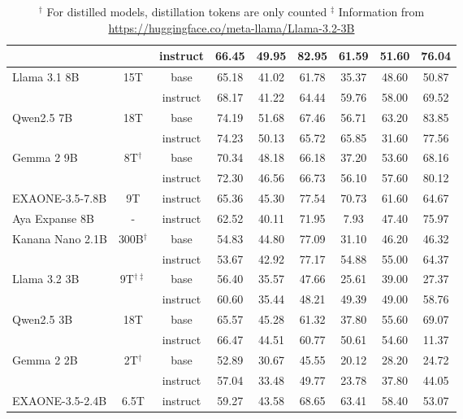 \begin{table}[h]
{\begin{tabular}{lcc|cccccc}
                                     & & instruct & 66.45 & 49.95 & 82.95 & 61.59 & 51.60 & 76.04 \\
\midrule
\multirow{2}{*}{Llama 3.1 8B}        & \multirow{2}{*}{15T} & base     & 65.18 & 41.02 & 61.78 & 35.37 & 48.60 & 50.87 \\
                                     & & instruct & 68.17 & 41.22 & 64.44 & 59.76 & 58.00 & 69.52 \\
\midrule
\multirow{2}{*}{Qwen2.5 7B}          & \multirow{2}{*}{18T} & base     & 74.19 & 51.68 & 67.46 & 56.71 & 63.20 & 83.85 \\
                                     & & instruct & 74.23 & 50.13 & 65.72 & 65.85 & 31.60 & 77.56 \\
\midrule
\multirow{2}{*}{Gemma 2 9B}          & \multirow{2}{*}{8T$^\dag$} & base     & 70.34 & 48.18 & 66.18 & 37.20 & 53.60 & 68.16 \\
                                     & & instruct & 72.30 & 46.56 & 66.73 & 56.10 & 57.60 & 80.12 \\
\midrule
EXAONE-3.5-7.8B                      & 9T & instruct & 65.36 & 45.30 & 77.54 & 70.73 & 61.60 & 64.67 \\
\midrule
Aya Expanse 8B                       & - & instruct & 62.52 & 40.11 & 71.95 &  7.93 & 47.40 & 75.97 \\
\midrule
\midrule
\multirow{2}{*}{Kanana Nano 2.1B}    & \multirow{2}{*}{300B$^\dag$} & base     & 54.83 & 44.80 & 77.09 & 31.10 & 46.20 & 46.32 \\
                                     & & instruct & 53.67 & 42.92 & 77.17 & 54.88 & 55.00 & 64.37 \\
\midrule
\multirow{2}{*}{Llama 3.2 3B}        & \multirow{2}{*}{9T$^{\dag\ddag}$} & base     & 56.40 & 35.57 & 47.66 & 25.61 & 39.00 & 27.37 \\
                                     & & instruct & 60.60 & 35.44 & 48.21 & 49.39 & 49.00 & 58.76 \\
\midrule
\multirow{2}{*}{Qwen2.5 3B}          & \multirow{2}{*}{18T} & base     & 65.57 & 45.28 & 61.32 & 37.80 & 55.60 & 69.07 \\
                                     & & instruct & 66.47 & 44.51 & 60.77 & 50.61 & 54.60 & 11.37 \\
\midrule
\multirow{2}{*}{Gemma 2 2B}          & \multirow{2}{*}{2T$^\dag$} & base     & 52.89 & 30.67 & 45.55 & 20.12 & 28.20 & 24.72 \\
                                     & & instruct & 57.04 & 33.48 & 49.77 & 23.78 & 37.80 & 44.05 \\
\midrule
EXAONE-3.5-2.4B                      & 6.5T & instruct & 59.27 & 43.58 & 68.65 & 63.41 & 58.40 & 53.07 \\
\bottomrule
\end{tabular}
}
\caption{
$^\dag$ For distilled models, distillation tokens are only counted
$^\ddag$ Information from \url{https://huggingface.co/meta-llama/Llama-3.2-3B}
}\label{table:appendix-pre-vs-post}
\end{table}

